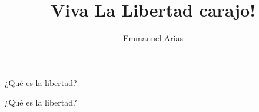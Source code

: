 \documentclass{beamer}
\title{Viva La Libertad carajo!}
\author{Emmanuel Arias}
\begin{document}
\begin{frame}[plain]
    \maketitle
\end{frame}
\begin{frame}
    \centering
    \Huge ¿Qué es la libertad?
\end{frame}
\begin{frame}
    \centering
    \Huge ¿Qué es la libertad?
\end{frame}
\end{document}
